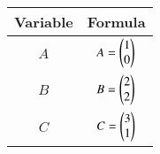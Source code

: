 \begin{center}
    \begin{tabular}{|c|c|} 
        \hline
            \textbf{Variable}  & \textbf{Formula} \\ 
        \hline
            $A$   & $A = \begin{pmatrix}1 \\ 0\end{pmatrix}$ \\ 
        \hline
            $B$   &  $B = \begin{pmatrix}2 \\ 2\end{pmatrix}$\\ 
        \hline
          $C$   &  $C = \begin{pmatrix}3 \\ 1\end{pmatrix}$\\ 
        \hline
           \end{tabular}
\end{center}  